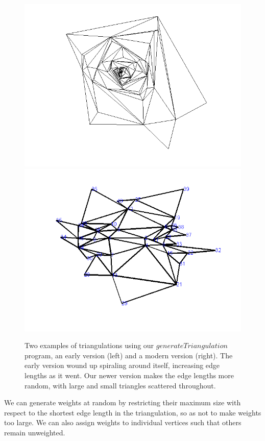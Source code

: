 \documentclass[12pt]{article}
\begin{document}
\begin{figure}
\centering
\includegraphics[scale = 0.45]{Pictures/gentri.png}
\includegraphics[scale = 0.45]{Pictures/gentri6.png}
\caption{Two examples of triangulations using our $generateTriangulation$ program, an early version (left) and a modern version (right). The early version wound up spiraling around itself, increasing edge lengths as it went. Our newer version makes the edge lengths more random, with large and small triangles scattered throughout.}
\label{genTris}
\end{figure}

 We can generate weights at random by restricting their maximum size with respect to the shortest edge length in the triangulation, so as not to make weights too large. We can also assign weights to individual vertices such that others remain unweighted. 
\end{document}
